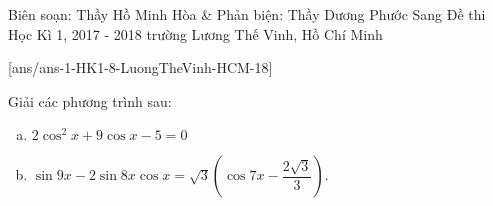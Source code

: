 	\begin{name}
{Biên soạn: Thầy Hồ Minh Hòa \& Phản biện: Thầy Dương Phước Sang}
		{Đề thi Học Kì 1, 2017 - 2018 trường Lương Thế Vinh, Hồ Chí Minh}
	\end{name}
	\setcounter{ex}{0}\setcounter{bt}{0}
	[ans/ans-1-HK1-8-LuongTheVinh-HCM-18]
\begin{bt}%
Giải các phương trình sau:
\begin{multicols}{2}
\begin{enumerate}[a.]
 \item $2\cos^2x+9\cos x-5=0$
 \item $\sin 9x-2\sin 8x\cos x=\sqrt{3}\left(\cos 7x-\dfrac{2\sqrt{3}}{3}\right)$.
\end{enumerate}
\end{multicols}
\end{bt}

